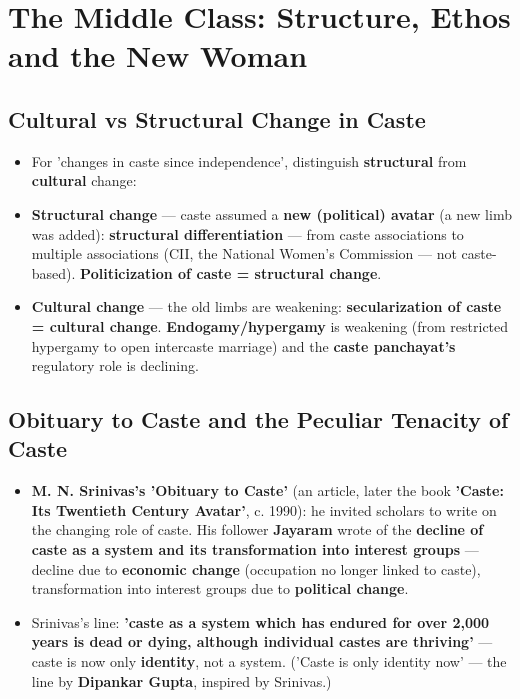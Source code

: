 \chapter{The Middle Class: Structure, Ethos and the New Woman}

\section{Cultural vs Structural Change in Caste}

\begin{KeyConcept}
\begin{itemize}
\item For 'changes in caste since independence', distinguish \textbf{structural} from \textbf{cultural} change:
\item \textbf{Structural change} --- caste assumed a \textbf{new (political) avatar} (a new limb was added): \textbf{structural differentiation} --- from caste associations to multiple associations (CII, the National Women's Commission --- not caste-based). \textbf{Politicization of caste = structural change}.
\item \textbf{Cultural change} --- the old limbs are weakening: \textbf{secularization of caste = cultural change}. \textbf{Endogamy/hypergamy} is weakening (from restricted hypergamy to open intercaste marriage) and the \textbf{caste panchayat's} regulatory role is declining.
\end{itemize}
\end{KeyConcept}

\section{Obituary to Caste and the Peculiar Tenacity of Caste}

\begin{KeyConcept}
\begin{itemize}
\item \textbf{M. N. Srinivas's 'Obituary to Caste'} (an article, later the book \textbf{'Caste: Its Twentieth Century Avatar'}, c. 1990): he invited scholars to write on the changing role of caste. His follower \textbf{Jayaram} wrote of the \textbf{decline of caste as a system and its transformation into interest groups} --- decline due to \textbf{economic change} (occupation no longer linked to caste), transformation into interest groups due to \textbf{political change}.
\item Srinivas's line: \textbf{'caste as a system which has endured for over 2,000 years is dead or dying, although individual castes are thriving'} --- caste is now only \textbf{identity}, not a system. ('Caste is only identity now' --- the line by \textbf{Dipankar Gupta}, inspired by Srinivas.)
\end{itemize}
\end{KeyConcept}

